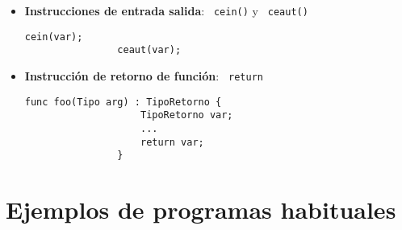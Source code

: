 \documentclass[10pt,a4paper]{article}
\begin{document}
\begin{itemize}
    \item \textbf{Instrucciones de entrada salida}: \texttt{\color{blue} cein()} y \texttt{\color{blue} ceaut()}
    \begin{center}
        \begin{minipage}{\linewidth}
            \begin{lstlisting}[linewidth=0.3\linewidth, gobble=16]
                cein(var);
                ceaut(var);
            \end{lstlisting}
        \end{minipage}
    \end{center}
    
    \item \textbf{Instrucción de retorno de función}: \texttt{\color{blue} return}
    \begin{center}
        \begin{minipage}{\linewidth}
            \begin{lstlisting}[linewidth=0.3\linewidth, gobble=16]
                func foo(Tipo arg) : TipoRetorno {
                    TipoRetorno var;
                    ...
                    return var;
                }
            \end{lstlisting}
        \end{minipage}
    \end{center}

\end{itemize}

\newpage
\appendix

\section{Ejemplos de programas habituales}






\end{document}
